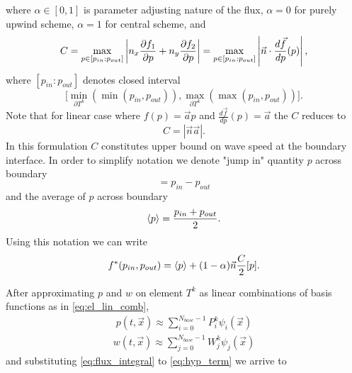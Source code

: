 where $\alpha \in [0, 1]$ is parameter adjusting nature of the flux, $\alpha = 0$ for purely upwind scheme, 
$\alpha = 1$ for central scheme,  and
\begin{equation}
	C = \max_{p \in [p_{in} : p_{out}]} \left\lvert n_x \frac{\partial f_1}{\partial p} + n_y \frac{\partial f_2}{\partial p}\right\rvert =
	    \max_{p \in [p_{in} : p_{out}]} \left\lvert\vec{n}\cdot\frac{d\vec{f}}{dp}(p)\right\rvert,
\end{equation}
where $[p_{in} : p_{out}]$ denotes closed interval 
$$\big[\min_{\partial{T^k}} (\min(p_{in}, p_{out})), 
	   \max_{\partial{T^k}}(\max(p_{in}, p_{out}))\big].$$ 
Note that for linear case where $f(p) = \vec{a}p$ and $\frac{d\vec{f}}{dp}(p) = \vec{a}$  
the $C$ reduces to
\begin{equation}
	C = |\vec{n}\vec{a}|.
\end{equation}
In this formulation $C$ constitutes upper bound on wave speed at the boundary interface.
In order to simplify notation we denote "jump in" 
quantity $p$ across boundary 
\begin{equation}
	[p] = p_{in} - p_{out}
\end{equation}
and the average of $p$ across boundary  
\begin{equation}
	\label{eq:avrg}
	\langle p\rangle = \frac{p_{in}+p_{out}}{2}.
\end{equation}
Using this notation we can write
\begin{equation}
	f^*(p_{in}, p_{out}) = \langle p\rangle + (1-\alpha) \vec{n}\frac{C}{2}[p].
\end{equation}



After approximating $p$ and $w$ on element $T^k$ as linear combinations of 
basis functions as in 
\eqref{eq:el_lin_comb},
\begin{align}\label{eq:state_epprox}
	p(t, \vec{x}) \approx \sum\limits_{i=0}^{N_{base}-1} P_i^k\psi_i(\vec{x})
\end{align}
\begin{align}\label{eq:test_approx}
	w(t, \vec{x}) \approx \sum\limits_{j=0}^{N_{base}-1} W_j^k\psi_j(\vec{x})
\end{align}
and substituting \eqref{eq:flux_integral} to \eqref{eq:hyp_term} we arrive to 

